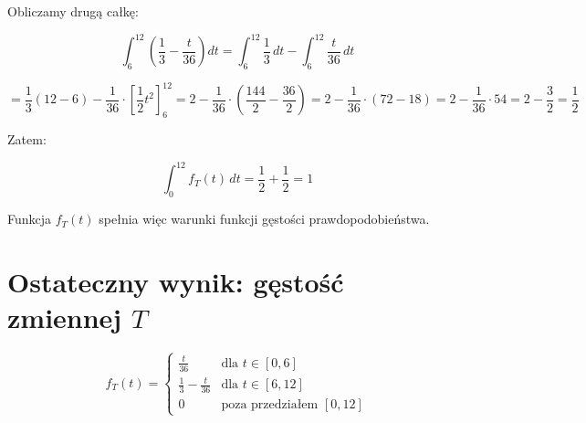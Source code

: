 \documentclass{article}
\begin{document}
Obliczamy drugą całkę:

\[
\int_6^{12} \left( \frac{1}{3} - \frac{t}{36} \right) dt = \int_6^{12} \frac{1}{3} \, dt - \int_6^{12} \frac{t}{36} \, dt
\]

\[
= \frac{1}{3}(12 - 6) - \frac{1}{36} \cdot \left[ \frac{1}{2}t^2 \right]_6^{12}
= 2 - \frac{1}{36} \cdot \left( \frac{144}{2} - \frac{36}{2} \right)
= 2 - \frac{1}{36} \cdot (72 - 18)
= 2 - \frac{1}{36} \cdot 54 = 2 - \frac{3}{2} = \frac{1}{2}
\]

Zatem:

\[
\int_0^{12} f_T(t) \, dt = \frac{1}{2} + \frac{1}{2} = 1
\]

Funkcja \( f_T(t) \) spełnia więc warunki funkcji gęstości prawdopodobieństwa.


\section{Ostateczny wynik: gęstość zmiennej \( T \)}

\[
f_T(t) =
\begin{cases}
\frac{t}{36} & \text{dla } t \in [0, 6] \\
\frac{1}{3} - \frac{t}{36} & \text{dla } t \in [6, 12] \\
0 & \text{poza przedziałem } [0, 12]
\end{cases}
\]
\end{document}
